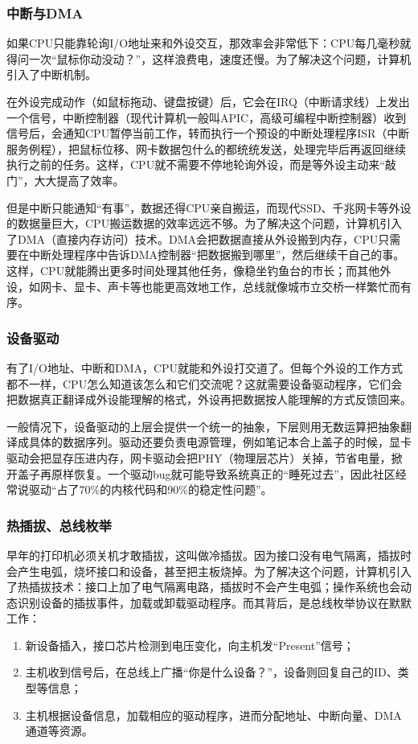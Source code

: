 \subsubsection{中断与DMA}

如果CPU只能靠轮询I/O地址来和外设交互，那效率会非常低下：CPU每几毫秒就得问一次“鼠标你动没动？”，这样浪费电，速度还慢。为了解决这个问题，计算机引入了中断机制。

在外设完成动作（如鼠标拖动、键盘按键）后，它会在IRQ（中断请求线）上发出一个信号，中断控制器（现代计算机一般叫APIC，高级可编程中断控制器）收到信号后，会通知CPU暂停当前工作，转而执行一个预设的中断处理程序ISR（中断服务例程），把鼠标位移、网卡数据包什么的都统统发送，处理完毕后再返回继续执行之前的任务。这样，CPU就不需要不停地轮询外设，而是等外设主动来“敲门”，大大提高了效率。

但是中断只能通知“有事”，数据还得CPU亲自搬运，而现代SSD、千兆网卡等外设的数据量巨大，CPU搬运数据的效率远远不够。为了解决这个问题，计算机引入了DMA（直接内存访问）技术。DMA会把数据直接从外设搬到内存，CPU只需要在中断处理程序中告诉DMA控制器“把数据搬到哪里”，然后继续干自己的事。这样，CPU就能腾出更多时间处理其他任务，像稳坐钓鱼台的市长；而其他外设，如网卡、显卡、声卡等也能更高效地工作，总线就像城市立交桥一样繁忙而有序。

\subsubsection{设备驱动}

有了I/O地址、中断和DMA，CPU就能和外设打交道了。但每个外设的工作方式都不一样，CPU怎么知道该怎么和它们交流呢？这就需要设备驱动程序，它们会把数据真正翻译成外设能理解的格式，外设再把数据按人能理解的方式反馈回来。

一般情况下，设备驱动的上层会提供一个统一的抽象，下层则用无数运算把抽象翻译成具体的数据序列。驱动还要负责电源管理，例如笔记本合上盖子的时候，显卡驱动会把显存压进内存，网卡驱动会把PHY（物理层芯片）关掉，节省电量，掀开盖子再原样恢复。一个驱动bug就可能导致系统真正的“睡死过去”，因此社区经常说驱动“占了70\%的内核代码和90\%的稳定性问题”。

\subsubsection{热插拔、总线枚举}

早年的打印机必须关机才敢插拔，这叫做冷插拔。因为接口没有电气隔离，插拔时会产生电弧，烧坏接口和设备，甚至把主板烧掉。为了解决这个问题，计算机引入了热插拔技术：接口上加了电气隔离电路，插拔时不会产生电弧；操作系统也会动态识别设备的插拔事件，加载或卸载驱动程序。而其背后，是总线枚举协议在默默工作：
\begin{enumerate}
  \item 新设备插入，接口芯片检测到电压变化，向主机发“Present”信号；
  \item 主机收到信号后，在总线上广播“你是什么设备？”，设备则回复自己的ID、类型等信息；
  \item 主机根据设备信息，加载相应的驱动程序，进而分配地址、中断向量、DMA通道等资源。
\end{enumerate}

